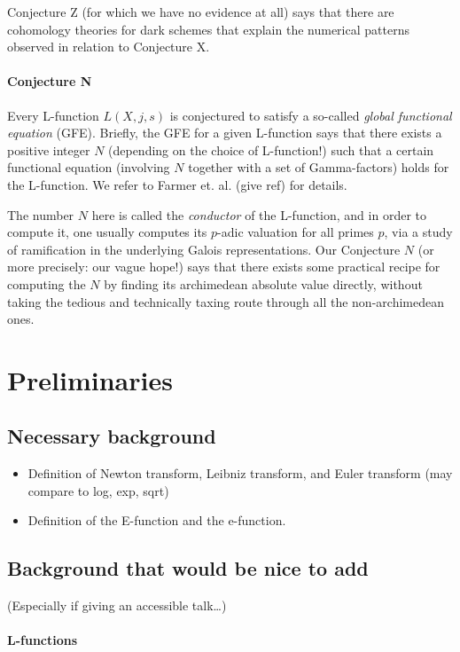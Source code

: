\documentclass[paper=a4, fontsize=11pt]{scrartcl} %
\numberwithin{equation}{section} %
\numberwithin{figure}{section} %
\numberwithin{table}{section} %
\begin{document}
Conjecture Z (for which we have no evidence at all) says that there are cohomology theories for dark schemes that explain the numerical patterns observed in relation to Conjecture X.


\paragraph{Conjecture N}

Every L-function $L(X, j, s)$ is conjectured to satisfy a so-called \emph{global functional equation} (GFE). Briefly, the GFE for a given L-function says that there exists a positive integer $N$ (depending on the choice of L-function!) such that a certain functional equation (involving $N$ together with a set of Gamma-factors) holds for the L-function. We refer to Farmer et. al. (give ref) for details.

The number $N$ here is called the \emph{conductor} of the L-function, and in order to compute it, one usually computes its $p$-adic valuation for all primes $p$, via a study of ramification in the underlying Galois representations. Our Conjecture $N$ (or more precisely: our vague hope!) says that there exists some practical recipe for computing the $N$ by finding its archimedean absolute value directly, without taking the tedious and technically taxing route through all the non-archimedean ones.


\section{Preliminaries}

\subsection{Necessary background}

\begin{itemize}
\item Definition of Newton transform, Leibniz transform, and Euler transform (may compare to log, exp, sqrt)
\item Definition of the E-function and the e-function.
\end{itemize}

\subsection{Background that would be nice to add}

(Especially if giving an accessible talk\ldots)
\paragraph{L-functions}
\end{document}

